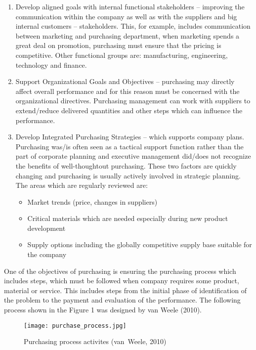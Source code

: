 \documentclass[oneside,12pt]{article}%
\begin{document}
\begin{enumerate}
  \item Develop aligned goals with internal functional stakeholders – improving the communication within the company as well as with the suppliers and big internal customers – stakeholders. This, for example, includes communication between marketing and purchasing department, when marketing spends a great deal on promotion, purchasing must ensure that the pricing is competitive. Other functional groups are: manufacturing, engineering, technology and finance.

  \item Support Organizational Goals and Objectives – purchasing may directly affect overall performance and for this reason must be concerned with the organizational directives. Purchasing management can work with suppliers to extend/reduce delivered quantities and other steps which can influence the performance.

  \item Develop Integrated Purchasing Strategies – which supports company plans. Purchasing was/is often seen as a tactical support function rather than the part of corporate planning and executive management did/does not recognize the benefits of well-thoughtout purchasing. These two factors are quickly changing and purchasing is usually actively involved in strategic planning. The areas which are regularly reviewed are:
  \begin{itemize}
    \item Market trends (price, changes in suppliers)
    \item Critical materials which are needed especially during new product development
    \item Supply options including the globally competitive supply base suitable for the company
  \end{itemize}

\end{enumerate}
  One of the objectives of purchasing is ensuring the purchasing process which includes steps, which must be followed when company requires some product, material or service. This includes steps from the initial phase of identification of the problem to the payment and evaluation of the performance. The following process shown in the Figure 1 was designed by van Weele (2010).


\begin{figure}[ht!]
  \texttt{[image: purchase\_process.jpg]}
  \caption{Purchasing process activites (van~Weele, 2010)}
\end{figure}
\end{document}

